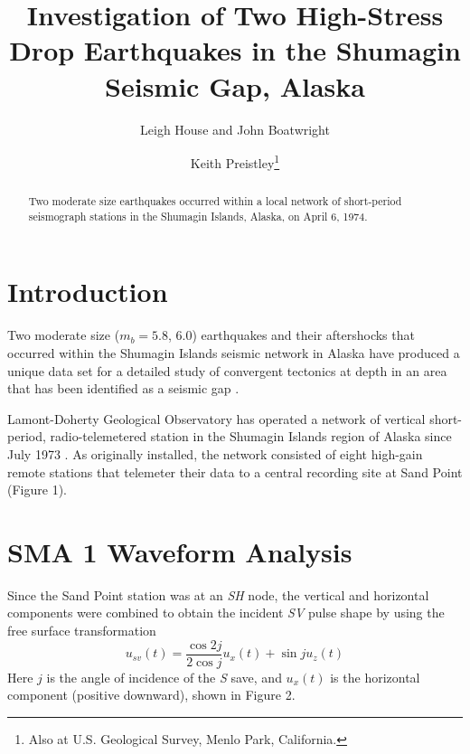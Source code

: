 

\title{Investigation of Two High-Stress Drop Earthquakes in the
  Shumagin Seismic Gap, Alaska}
\author{Leigh House and John Boatwright}
\address{Lamont-Doherty Geological Observatory and Department of
  Geological Sciences, Columbia University
  Palisades, New York}
\author{Keith Preistley\thanks{Also at U.S. Geological Survey,
  Menlo Park, California.}}
\address{Seismological Laboratory, Mackay School of Mines, University of
  Nevada at Reno}
\maketitle

\begin{abstract}
Two moderate size earthquakes occurred within a local network of
short-period seismograph stations in the Shumagin Islands, Alaska, on
April 6, 1974.
\end{abstract}

\section{Introduction}
Two moderate size ($m_b =5.8$, $6.0$) earthquakes and their
aftershocks that occurred within the Shumagin Islands seismic network
in Alaska have produced a unique data set for a detailed study of
convergent tectonics at depth in an area that has been identified as a
seismic gap \cite{kelleher}.

Lamont-Doherty Geological Observatory has operated a network of
vertical short-period, radio-telemetered station in the Shumagin
Islands region of Alaska since July 1973 \cite{davies}.  As originally
installed, the network consisted of eight high-gain remote stations that
telemeter their data to a central recording site at Sand Point (Figure 1).

\section{SMA 1 Waveform Analysis}
Since the Sand Point station was at an {\em SH\/} node, the vertical
and horizontal components were combined to obtain the incident {\em
SV\/} pulse shape by using the free surface transformation
\begin{equation}
u_{sv}(t) = \frac{\cos 2j}{2 \cos j} u_x(t) + \sin ju_z(t)
\end{equation}
Here $j$ is the angle of incidence of the {\em S\/} save, and $u_x(t)$
is the horizontal component (positive downward), shown in Figure 2.

